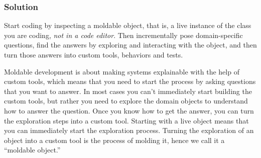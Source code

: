 \documentclass[sigconf]{acmart}
\renewcommand{\nbc}[3]{} %
\newcommand\eog[1]{\nbc{Edward}{#1}{purple}}
\begin{document}

\subsubsection*{Solution}
Start coding by inspecting a moldable object, that is, a live instance of the class you are coding, \emph{not in a code editor}.
Then incrementally pose domain-specific questions, find the answers by exploring and interacting with the object, and then turn those answers into custom tools, behaviors and tests.


Moldable development is about making systems explainable with the help of custom tools, which means that you need to start the process by asking questions that you want to answer.
In most cases you can't immediately start building the custom tools, but rather you need to explore the domain objects to understand how to answer the question.
Once you know how to get the answer, you can turn the exploration steps into a custom tool.
Starting with a live object means that you can immediately start the exploration process.
Turning the exploration of an object into a custom tool is the process of molding it, hence we call it a ``moldable object.''


\end{document}
